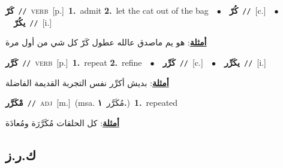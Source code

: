 \documentclass[10pt,a4paper,twoside]{article} %
\begin{document}
\begin{multicols}{2}
{\setlength\topsep{0pt}\textbf{\foreignlanguage{arabic}{كَرّ}}\ {\color{gray}\texttt{//}\color{black}}\ \textsc{verb}\ [p.]\ \textbf{1.}~admit  \textbf{2.}~let the cat out of the bag\ \ $\bullet$\ \ \setlength\topsep{0pt}\textbf{\foreignlanguage{arabic}{كُرّ}}\ {\color{gray}\texttt{//}\color{black}}\ [c.]\ \ $\bullet$\ \ \setlength\topsep{0pt}\textbf{\foreignlanguage{arabic}{يكُرّ}}\ {\color{gray}\texttt{//}\color{black}}\ [i.]\  \begin{flushright}\color{gray}\foreignlanguage{arabic}{\textbf{\underline{\foreignlanguage{arabic}{أمثلة}}}: هو يم ماصدق عالله عطول كَرّ كل شي من أول مرة}\end{flushright}\color{black}} \vspace{2mm}

{\setlength\topsep{0pt}\textbf{\foreignlanguage{arabic}{كَرَّر}}\ {\color{gray}\texttt{//}\color{black}}\ \textsc{verb}\ [p.]\ \textbf{1.}~repeat  \textbf{2.}~refine\ \ $\bullet$\ \ \setlength\topsep{0pt}\textbf{\foreignlanguage{arabic}{كَرِّر}}\ {\color{gray}\texttt{//}\color{black}}\ [c.]\ \ $\bullet$\ \ \setlength\topsep{0pt}\textbf{\foreignlanguage{arabic}{يكَرِّر}}\ {\color{gray}\texttt{//}\color{black}}\ [i.]\  \begin{flushright}\color{gray}\foreignlanguage{arabic}{\textbf{\underline{\foreignlanguage{arabic}{أمثلة}}}: بديش أكرِّر نفس التجربة القديمة الفاضلة}\end{flushright}\color{black}} \vspace{2mm}

{\setlength\topsep{0pt}\textbf{\foreignlanguage{arabic}{مْكَرَّر}}\ {\color{gray}\texttt{//}\color{black}}\ \textsc{adj}\ [m.]\ \color{gray}(msa. \foreignlanguage{arabic}{مُكَرَّر}~\foreignlanguage{arabic}{\textbf{١.}})\color{black}\ \textbf{1.}~repeated\  \begin{flushright}\color{gray}\foreignlanguage{arabic}{\textbf{\underline{\foreignlanguage{arabic}{أمثلة}}}: كل الحلقات مُكَرَّرَة ومُعادَة}\end{flushright}\color{black}} \vspace{2mm}

\vspace{-3mm}
\subsection*{\color{blue}\foreignlanguage{arabic}{ك.ر.ز}\color{blue}{}} 


\end{multicols}
\end{document}
